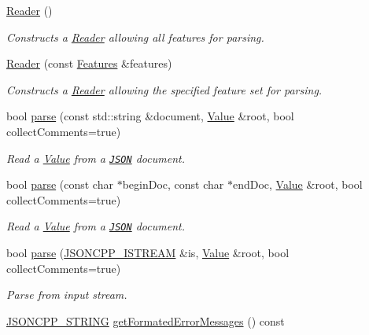 \begin{DoxyCompactItemize}
\item 
\hyperlink{class_json_1_1_reader_a0b3c4e24c8393354bab57a6ba3ffc27f}{Reader} ()
\begin{DoxyCompactList}\small\item\em Constructs a \hyperlink{class_json_1_1_reader}{Reader} allowing all features for parsing. \end{DoxyCompactList}\item 
\hyperlink{class_json_1_1_reader_a45f17831118337309180313e93ac33f8}{Reader} (const \hyperlink{class_json_1_1_features}{Features} \&features)
\begin{DoxyCompactList}\small\item\em Constructs a \hyperlink{class_json_1_1_reader}{Reader} allowing the specified feature set for parsing. \end{DoxyCompactList}\item 
bool \hyperlink{class_json_1_1_reader_af1da6c976ad1e96c742804c3853eef94}{parse} (const std\+::string \&document, \hyperlink{class_json_1_1_value}{Value} \&root, bool collect\+Comments=true)
\begin{DoxyCompactList}\small\item\em Read a \hyperlink{class_json_1_1_value}{Value} from a \href{http://www.json.org}{\tt J\+S\+ON} document. \end{DoxyCompactList}\item 
bool \hyperlink{class_json_1_1_reader_ac71ef2b64c7c27b062052e692af3fb32}{parse} (const char $\ast$begin\+Doc, const char $\ast$end\+Doc, \hyperlink{class_json_1_1_value}{Value} \&root, bool collect\+Comments=true)
\begin{DoxyCompactList}\small\item\em Read a \hyperlink{class_json_1_1_value}{Value} from a \href{http://www.json.org}{\tt J\+S\+ON} document. \end{DoxyCompactList}\item 
bool \hyperlink{class_json_1_1_reader_a6d5d0e23f68749d2f17feece4ccf504d}{parse} (\hyperlink{json_8h_a15f2f70b2ce0a2abd0f8112393dbc4de}{J\+S\+O\+N\+C\+P\+P\+\_\+\+I\+S\+T\+R\+E\+AM} \&is, \hyperlink{class_json_1_1_value}{Value} \&root, bool collect\+Comments=true)
\begin{DoxyCompactList}\small\item\em Parse from input stream. \end{DoxyCompactList}\item 
\hyperlink{json_8h_a1e723f95759de062585bc4a8fd3fa4be}{J\+S\+O\+N\+C\+P\+P\+\_\+\+S\+T\+R\+I\+NG} \hyperlink{class_json_1_1_reader_a791cbc5afd1bef1631e07239dc452c79}{get\+Formated\+Error\+Messages} () const

\end{DoxyCompactItemize}
